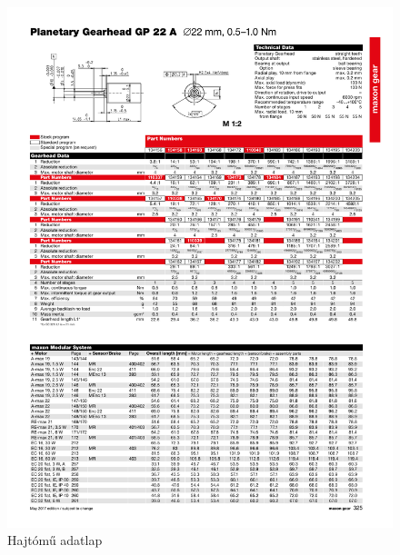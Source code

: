 \begin{figure}[H]
    \begin{center}
    \includegraphics[width=\textwidth]{images/gearhead.pdf}
    \caption{Hajtómű adatlap}\label{fig:gearhead_datasheet}
    \end{center}
\end{figure}

